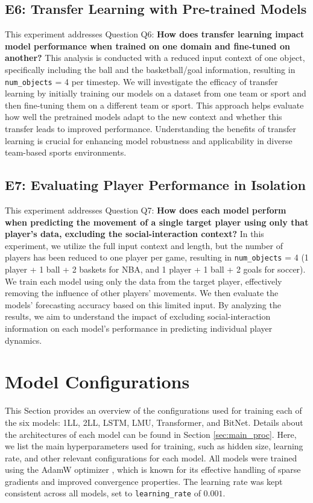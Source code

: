 \subsection{E6: Transfer Learning with Pre-trained Models}
\label{exp:e6}
This experiment addresses Question Q6: \textbf{How does transfer learning impact model performance when trained on one domain and fine-tuned on another?} This analysis is conducted with a reduced input context of one object, specifically including the ball and the basketball/goal information, resulting in \texttt{num\_objects} = 4 per timestep. We will investigate the efficacy of transfer learning by initially training our models on a dataset from one team or sport and then fine-tuning them on a different team or sport. This approach helps evaluate how well the pretrained models adapt to the new context and whether this transfer leads to improved performance. Understanding the benefits of transfer learning is crucial for enhancing model robustness and applicability in diverse team-based sports environments.

\subsection{E7: Evaluating Player Performance in Isolation}
\label{exp:e7}
This experiment addresses Question Q7: \textbf{How does each model perform when predicting the movement of a single target player using only that player's data, excluding the social-interaction context?} In this experiment, we utilize the full input context and length, but the number of players has been reduced to one player per game, resulting in \texttt{num\_objects} = 4 (1 player + 1 ball + 2 baskets for NBA, and 1 player + 1 ball + 2 goals for soccer). We train each model using only the data from the target player, effectively removing the influence of other players' movements. We then evaluate the models' forecasting accuracy based on this limited input. By analyzing the results, we aim to understand the impact of excluding social-interaction information on each model's performance in predicting individual player dynamics.



\section{Model Configurations}
\label{sec:model_configurations}

This Section provides an overview of the configurations used for training each of the six models: 1LL, 2LL, LSTM, LMU, Transformer, and BitNet. Details about the architectures of each model can be found in Section \ref{sec:main_proc}. Here, we list the main hyperparameters used for training, such as hidden size, learning rate, and other relevant configurations for each model. All models were trained using the AdamW optimizer \cite{adamw}, which is known for its effective handling of sparse gradients and improved convergence properties. The learning rate was kept consistent across all models, set to \texttt{learning\_rate} of $0.001$.

